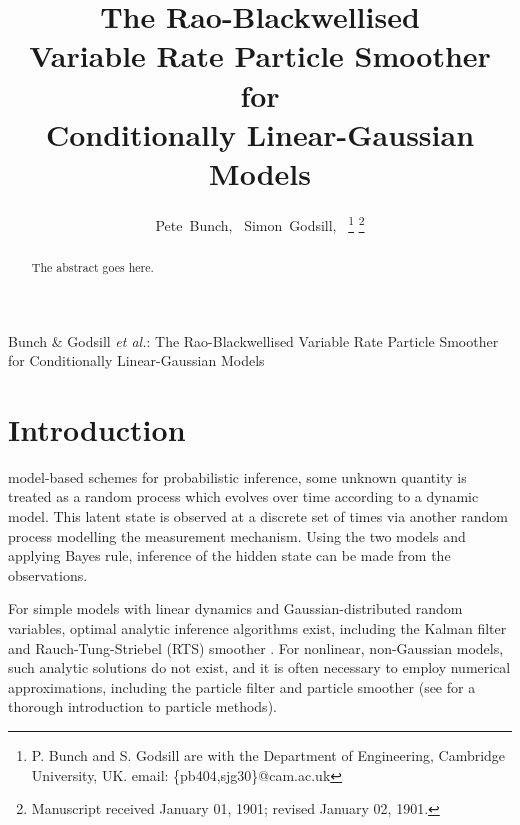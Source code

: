 \documentclass[journal]{IEEEtran}
\begin{document}
\title{The Rao-Blackwellised \\ Variable Rate Particle Smoother for \\ Conditionally Linear-Gaussian Models}

\author{Pete~Bunch,~\IEEEmembership{}
        Simon~Godsill,~%
\thanks{P. Bunch and S. Godsill are with the Department
of Engineering, Cambridge University, UK. email: \{pb404,sjg30\}@cam.ac.uk}%
\thanks{Manuscript received January 01, 1901; revised January 02, 1901.}}

%
{Bunch \& Godsill \MakeLowercase{\textit{et al.}}: The Rao-Blackwellised Variable Rate Particle Smoother for Conditionally Linear-Gaussian Models}

\maketitle

\begin{abstract}
The abstract goes here.
\end{abstract}

\begin{IEEEkeywords}

\end{IEEEkeywords}



\section{Introduction}
 model-based schemes for probabilistic inference, some unknown quantity is treated as a random process which evolves over time according to a dynamic model. This latent state is observed at a discrete set of times via another random process modelling the measurement mechanism. Using the two models and applying Bayes rule, inference of the hidden state can be made from the observations.

For simple models with linear dynamics and Gaussian-distributed random variables, optimal analytic inference algorithms exist, including the Kalman filter \cite{Kalman1960} and Rauch-Tung-Striebel (RTS) smoother \cite{Rauch1965}. For nonlinear, non-Gaussian models, such analytic solutions do not exist, and it is often necessary to employ numerical approximations, including the particle filter \cite{Gordon1993} and particle smoother \cite{Doucet2000a,Godsill2004} (see \cite{Cappe2007,Doucet2009} for a thorough introduction to particle methods).
\end{document}
